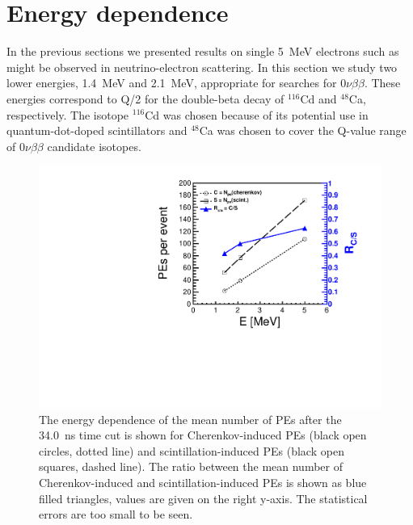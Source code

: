\documentclass[cits]{JINST}
\begin{document}
\section{Energy dependence}
\label{edep_section}
In the previous sections we presented results on single 5~MeV electrons such as might be observed in neutrino-electron scattering.
In this section we study two lower energies, 1.4~MeV and 2.1~MeV, appropriate for searches for $0\nu\beta\beta$. These
energies correspond to Q/2 for the double-beta decay of
$^{116}$Cd and $^{48}$Ca, respectively\cite{cd1,biller}. The isotope
$^{116}$Cd was chosen because of its potential use in quantum-dot-doped
scintillators\cite{qdot,qdot2} and $^{48}$Ca was chosen
to cover the Q-value range of $0\nu\beta\beta$ candidate isotopes.

\begin{figure}
        \begin{center}
        \includegraphics[scale=0.5]{graphs/PEandR_vs_energy_final.pdf}
        \caption[]{The energy dependence of the mean number of PEs after the 34.0~ns time cut is shown for Cherenkov-induced PEs (black open circles, dotted line) and scintillation-induced PEs (black open squares, dashed line). The ratio between the mean number of Cherenkov-induced and scintillation-induced PEs is shown as blue filled triangles, values are given on the right y-axis. The statistical errors are too small to be seen. \label{Edep_NPE}}
        \end{center}
\end{figure}
\end{document}
